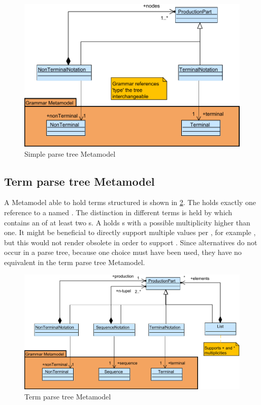 \begin{figure}
\centering
\includegraphics[scale=0.75]{gfx/ex/Notation_ParseTree} 
\caption{Simple parse tree Metamodel}
\label{MM:Not:PT}
\end{figure}

\subsection{Term parse tree Metamodel} A Metamodel able to hold terms structured is shown in \ref{MM:Not:TT}. The  holds exactly one reference to a  named . The distinction in different terms is held by  which contains an  of at least two s. A  holds s with a possible multiplicity higher than one. It might be beneficial to directly support multiple values per , for example , but this would not render  obsolete in order to support . Since alternatives do not occur in a parse tree, because one choice must have been used, they have no equivalent in the term parse tree Metamodel. 

\begin{figure}
\centering
\includegraphics[scale=0.75]{gfx/ex/Notation_TermTree} 
\caption{Term parse tree Metamodel}
\label{MM:Not:TT}
\end{figure}

